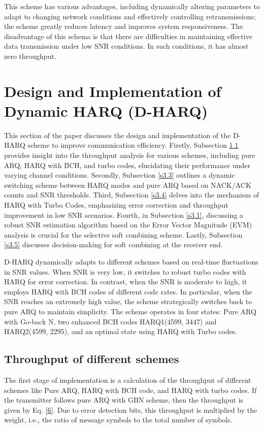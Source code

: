 \documentclass[sn-mathphys-num]{sn-jnl}
\theoremstyle{thmstyleone}
\theoremstyle{thmstyletwo}%
\theoremstyle{thmstylethree}%
\begin{document}
This scheme has various advantages, including dynamically altering parameters to adapt to changing network conditions and effectively controlling retransmissions; the scheme greatly reduces latency and improves system responsiveness. The disadvantage of this schema is that there are difficulties in maintaining effective data transmission under low SNR conditions. In such conditions, it has almost zero throughput.

\section{Design and Implementation of Dynamic HARQ (D-HARQ)} \label{s3}

This section of the paper discusses the design and implementation of the D-HARQ scheme to improve communication efficiency. Firstly, Subsection \ref{s3.2} provides insight into the throughput analysis for various schemes, including pure ARQ, HARQ with BCH, and turbo codes, elucidating their performance under varying channel conditions. Secondly, Subsection \ref{s3.3} outlines a dynamic switching scheme between HARQ modes and pure ARQ based on NACK/ACK counts and SNR thresholds. Third, Subsection \ref{s3.4} delves into the mechanism of HARQ with Turbo Codes, emphasizing error correction and throughput improvement in low SNR scenarios. Fourth, in Subsection \ref{s3.1}, discussing a robust SNR estimation algorithm based on the Error Vector Magnitude (EVM) analysis is crucial for the selective soft combining scheme. Lastly, Subsection \ref{s3.5} discusses decision-making for soft combining at the receiver end.

D-HARQ dynamically adapts to different schemes based on real-time fluctuations in SNR values. When SNR is very low, it switches to robust turbo codes with HARQ for error correction. In contrast, when the SNR is moderate to high, it employs HARQ with BCH codes of different code rates. In particular, when the SNR reaches an extremely high value, the scheme strategically switches back to pure ARQ to maintain simplicity. The scheme operates in four states: Pure ARQ with Go-back N, two enhanced BCH codes HARQ1(4599, 3447) and HARQ2(4599, 2295), and an optimal state using HARQ with Turbo codes.

\subsection{Throughput of different schemes} \label{s3.2}

The first stage of implementation is a calculation of the throughput of different schemes like Pure ARQ, HARQ with BCH code, and HARQ with turbo codes. If the transmitter follows pure ARQ with GBN scheme, then the throughput is given by Eq. \ref{6}. Due to error detection bits, this throughput is multiplied by the weight, i.e., the ratio of message symbols to the total number of symbols.
\end{document}
